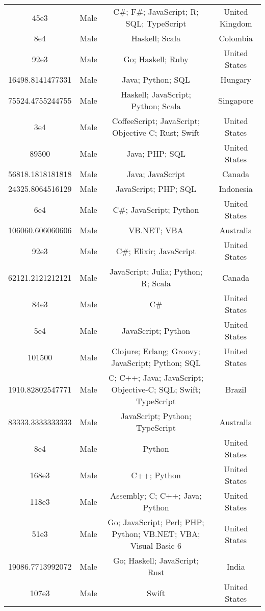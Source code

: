 \begin{center}
\begin{tabular}{ |c|c|c|c| }
45e3  &  Male  &  C\#; F\#; JavaScript; R; SQL; TypeScript  &  United Kingdom  \\ 
8e4  &  Male  &  Haskell; Scala  &  Colombia  \\ 
92e3  &  Male  &  Go; Haskell; Ruby  &  United States  \\ 
16498.8141477331  &  Male  &  Java; Python; SQL  &  Hungary  \\ 
75524.4755244755  &  Male  &  Haskell; JavaScript; Python; Scala  &  Singapore  \\ 
3e4  &  Male  &  CoffeeScript; JavaScript; Objective-C; Rust; Swift  &  United States  \\ 
89500  &  Male  &  Java; PHP; SQL  &  United States  \\ 
56818.1818181818  &  Male  &  Java; JavaScript  &  Canada  \\ 
24325.8064516129  &  Male  &  JavaScript; PHP; SQL  &  Indonesia  \\ 
6e4  &  Male  &  C\#; JavaScript; Python  &  United States  \\ 
106060.606060606  &  Male  &  VB.NET; VBA  &  Australia  \\ 
92e3  &  Male  &  C\#; Elixir; JavaScript  &  United States  \\ 
62121.2121212121  &  Male  &  JavaScript; Julia; Python; R; Scala  &  Canada  \\ 
84e3  &  Male  &  C\#  &  United States  \\ 
5e4  &  Male  &  JavaScript; Python  &  United States  \\ 
101500  &  Male  &  Clojure; Erlang; Groovy; JavaScript; Python; SQL  &  United States  \\ 
1910.82802547771  &  Male  &  C; C++; Java; JavaScript; Objective-C; SQL; Swift; TypeScript  &  Brazil  \\ 
83333.3333333333  &  Male  &  JavaScript; Python; TypeScript  &  Australia  \\ 
8e4  &  Male  &  Python  &  United States  \\ 
168e3  &  Male  &  C++; Python  &  United States  \\ 
118e3  &  Male  &  Assembly; C; C++; Java; Python  &  United States  \\ 
51e3  &  Male  &  Go; JavaScript; Perl; PHP; Python; VB.NET; VBA; Visual Basic 6  &  United States  \\ 
19086.7713992072  &  Male  &  Go; Haskell; JavaScript; Rust  &  India  \\ 
107e3  &  Male  &  Swift  &  United States  \\ 

\end{tabular}
\end{center}
